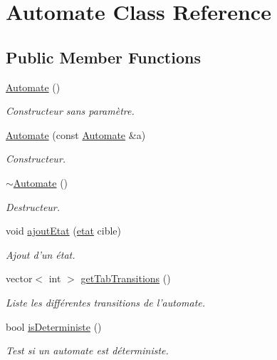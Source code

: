 \hypertarget{class_automate}{\section{Automate Class Reference}
\label{class_automate}
}
\subsection*{Public Member Functions}
\begin{DoxyCompactItemize}
\item 
\hyperlink{class_automate_a79dcc6fd193e40ab8246b4a70b904a11}{Automate} ()
\begin{DoxyCompactList}\small\item\em Constructeur sans paramètre. \end{DoxyCompactList}\item 
\hyperlink{class_automate_a89c0c96d304c3de5d7587df5f60b6c7c}{Automate} (const \hyperlink{class_automate}{Automate} \&a)
\begin{DoxyCompactList}\small\item\em Constructeur. \end{DoxyCompactList}\item 
\hyperlink{class_automate_a25a6a03be274fd4984139b815aad0092}{$\sim$\-Automate} ()
\begin{DoxyCompactList}\small\item\em Destructeur. \end{DoxyCompactList}\item 
void \hyperlink{class_automate_a095077a318aea188cbcd663deaa97a97}{ajout\-Etat} (\hyperlink{classetat}{etat} cible)
\begin{DoxyCompactList}\small\item\em Ajout d'un état. \end{DoxyCompactList}\item 
vector$<$ int $>$ \hyperlink{class_automate_a3f8def92c8e75035516d9e67dcb244d9}{get\-Tab\-Transitions} ()
\begin{DoxyCompactList}\small\item\em Liste les différentes transitions de l'automate. \end{DoxyCompactList}\item 
bool \hyperlink{class_automate_a6b63a438c3e8af81e2cdf8493a949232}{is\-Deterministe} ()
\begin{DoxyCompactList}\small\item\em Test si un automate est déterministe. \end{DoxyCompactList}\item 

\end{DoxyCompactItemize}
